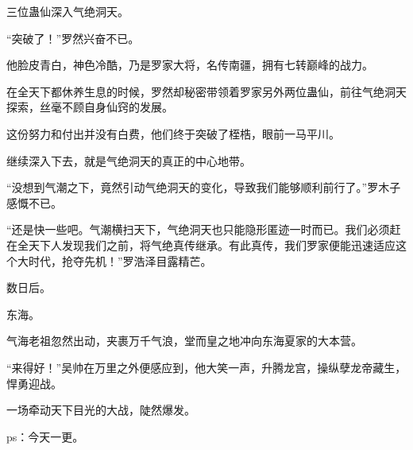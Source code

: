 \begin{this_body}
三位蛊仙深入气绝洞天。

“突破了！”罗然兴奋不已。

他脸皮青白，神色冷酷，乃是罗家大将，名传南疆，拥有七转巅峰的战力。

在全天下都休养生息的时候，罗然却秘密带领着罗家另外两位蛊仙，前往气绝洞天探索，丝毫不顾自身仙窍的发展。

这份努力和付出并没有白费，他们终于突破了桎梏，眼前一马平川。

继续深入下去，就是气绝洞天的真正的中心地带。

“没想到气潮之下，竟然引动气绝洞天的变化，导致我们能够顺利前行了。”罗木子感慨不已。

“还是快一些吧。气潮横扫天下，气绝洞天也只能隐形匿迹一时而已。我们必须赶在全天下人发现我们之前，将气绝真传继承。有此真传，我们罗家便能迅速适应这个大时代，抢夺先机！”罗浩泽目露精芒。

数日后。

东海。

气海老祖忽然出动，夹裹万千气浪，堂而皇之地冲向东海夏家的大本营。

“来得好！”吴帅在万里之外便感应到，他大笑一声，升腾龙宫，操纵孽龙帝藏生，悍勇迎战。

一场牵动天下目光的大战，陡然爆发。

ps：今天一更。

\end{this_body}

